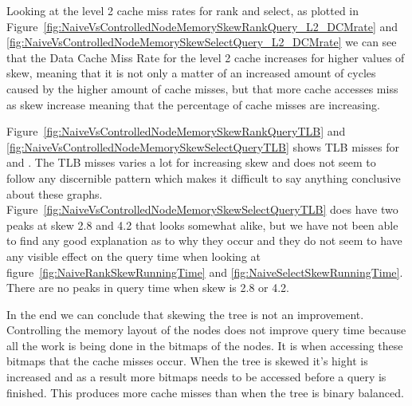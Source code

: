 Looking at the level 2 cache miss rates for rank and select, as plotted in Figure~\ref{fig:NaiveVsControlledNodeMemorySkewRankQuery_L2_DCMrate} and \ref{fig:NaiveVsControlledNodeMemorySkewSelectQuery_L2_DCMrate} we can see that the Data Cache Miss Rate for the level 2 cache increases for higher values of skew, meaning that it is not only a matter of an increased amount of cycles caused by the higher amount of cache misses, but that more cache accesses miss as skew increase meaning that the percentage of cache misses are increasing.

Figure~\ref{fig:NaiveVsControlledNodeMemorySkewRankQueryTLB} and \ref{fig:NaiveVsControlledNodeMemorySkewSelectQueryTLB} shows TLB misses for  and . 
The TLB misses varies a lot for increasing skew and does not seem to follow any discernible pattern which makes it difficult to say anything conclusive about these graphs. 
Figure~\ref{fig:NaiveVsControlledNodeMemorySkewSelectQueryTLB} does have two peaks at skew 2.8 and 4.2 that looks somewhat alike, but we have not been able to find any good explanation as to why they occur and they do not seem to have any visible effect on the query time when looking at figure~\ref{fig:NaiveRankSkewRunningTime} and \ref{fig:NaiveSelectSkewRunningTime}.
There are no peaks in query time when skew is 2.8 or 4.2.

In the end we can conclude that skewing the tree is not an improvement. 
Controlling the memory layout of the nodes does not improve query time because all the work is being done in the bitmaps of the nodes.
It is when accessing these bitmaps that the cache misses occur.
When the tree is skewed it's hight is increased and as a result more bitmaps needs to be accessed before a query is finished. 
This produces more cache misses than when the tree is binary balanced.



